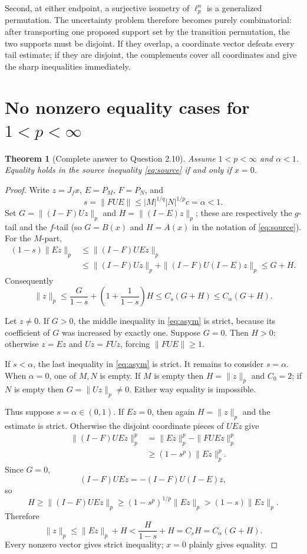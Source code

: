 \documentclass[11pt]{article}
\newtheorem{theorem}{Theorem}
\begin{document}
Second, at either endpoint, a surjective isometry of $\ell_p^n$ is a
generalized permutation.  The uncertainty problem therefore becomes purely
combinatorial: after transporting one proposed support set by the transition
permutation, the two supports must be disjoint.  If they overlap, a coordinate
vector defeats every tail estimate; if they are disjoint, the complements
cover all coordinates and give the sharp inequalities immediately.

\section{No nonzero equality cases for \texorpdfstring{$1<p<\infty$}{1<p<infinity}}

\begin{theorem}[Complete answer to Question 2.10]\label{thm:strict}
Assume $1<p<\infty$ and $\alpha<1$.  Equality holds in the source inequality
\eqref{eq:source} if and only if $x=0$.
\end{theorem}

\begin{proof}
Write $z=J_fx$, $E=P_M$, $F=P_N$, and
\[
 s=\|FUE\|\le |M|^{1/q}|N|^{1/p}c=\alpha<1.
\]
Set $G=\|(I-F)Uz\|_p$ and $H=\|(I-E)z\|_p$; these are respectively the
$g$-tail and the $f$-tail (so $G=B(x)$ and $H=A(x)$ in the notation of
\eqref{eq:source}).  For the $M$-part,
\begin{align}
 (1-s)\|Ez\|_p
 &\le \|(I-F)UEz\|_p \\
 &\le \|(I-F)Uz\|_p+\|(I-F)U(I-E)z\|_p
 \le G+H.\label{eq:key}
\end{align}
Consequently
\begin{equation}\label{eq:asym}
 \|z\|_p
 \le \frac{G}{1-s}+\left(1+\frac1{1-s}\right)H
 \le C_s(G+H)\le C_\alpha(G+H).
\end{equation}

Let $z\ne0$.  If $G>0$, the middle inequality in \eqref{eq:asym} is strict,
because its coefficient of $G$ was increased by exactly one.  Suppose
$G=0$.  Then $H>0$: otherwise $z=Ez$ and $Uz=FUz$, forcing
$\|FUE\|\ge1$.

If $s<\alpha$, the last inequality in \eqref{eq:asym} is strict.  It remains
to consider $s=\alpha$.  When $\alpha=0$, one of $M,N$ is empty.  If $M$ is
empty then $H=\|z\|_p$ and $C_0=2$; if $N$ is empty then
$G=\|Uz\|_p\ne0$.  Either way equality is impossible.

Thus suppose $s=\alpha\in(0,1)$.  If $Ez=0$, then again
$H=\|z\|_p$ and the estimate is strict.  Otherwise the disjoint coordinate
pieces of $UEz$ give
\begin{align*}
 \|(I-F)UEz\|_p^p
 &=\|Ez\|_p^p-\|FUEz\|_p^p\\
 &\ge(1-s^p)\|Ez\|_p^p.
\end{align*}
Since $G=0$,
\[
 (I-F)UEz=-(I-F)U(I-E)z,
\]
so
\[
 H\ge\|(I-F)UEz\|_p
 \ge(1-s^p)^{1/p}\|Ez\|_p
 >(1-s)\|Ez\|_p.
\]
Therefore
\[
 \|z\|_p\le\|Ez\|_p+H
 <\frac{H}{1-s}+H=C_sH=C_\alpha(G+H).
\]
Every nonzero vector gives strict inequality; $x=0$ plainly gives equality.
\end{proof}
\end{document}
